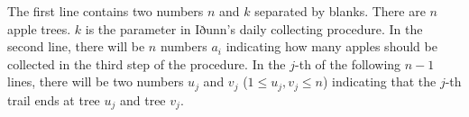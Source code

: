 The first line contains two numbers $n$ and $k$ separated by blanks. 
There are $n$ apple trees. $k$ is the parameter in Iðunn's daily collecting 
procedure. 
In the second line, there will be $n$ numbers $a_i$ 
indicating how many apples should be collected in the third
step of the procedure. 
In the $j$-th of the following $n-1$ lines, there will be 
two numbers $u_j$ and $v_j$ ($1\le u_j,v_j\le n$) indicating that the $j$-th 
trail ends at tree $u_j$ and tree $v_j$.

